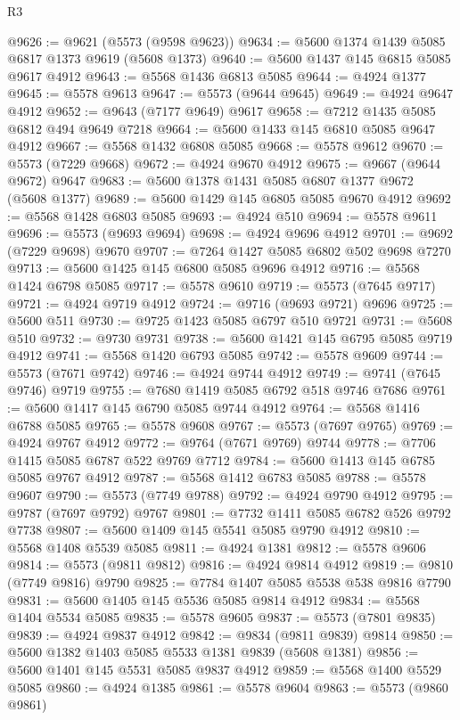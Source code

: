 \begin{lexlean}{R3}
\begin{coremodule}
@9626 := @9621 (@5573 (@9598 @9623))
@9634 := @5600 @1374 @1439 @5085 @6817 @1373 @9619 (@5608 @1373)
@9640 := @5600 @1437 @145 @6815 @5085 @9617 @4912
@9643 := @5568 @1436 @6813 @5085
@9644 := @4924 @1377
@9645 := @5578 @9613
@9647 := @5573 (@9644 @9645)
@9649 := @4924 @9647 @4912
@9652 := @9643 (@7177 @9649) @9617
@9658 := @7212 @1435 @5085 @6812 @494 @9649 @7218
@9664 := @5600 @1433 @145 @6810 @5085 @9647 @4912
@9667 := @5568 @1432 @6808 @5085
@9668 := @5578 @9612
@9670 := @5573 (@7229 @9668)
@9672 := @4924 @9670 @4912
@9675 := @9667 (@9644 @9672) @9647
@9683 := @5600 @1378 @1431 @5085 @6807 @1377 @9672 (@5608 @1377)
@9689 := @5600 @1429 @145 @6805 @5085 @9670 @4912
@9692 := @5568 @1428 @6803 @5085
@9693 := @4924 @510
@9694 := @5578 @9611
@9696 := @5573 (@9693 @9694)
@9698 := @4924 @9696 @4912
@9701 := @9692 (@7229 @9698) @9670
@9707 := @7264 @1427 @5085 @6802 @502 @9698 @7270
@9713 := @5600 @1425 @145 @6800 @5085 @9696 @4912
@9716 := @5568 @1424 @6798 @5085
@9717 := @5578 @9610
@9719 := @5573 (@7645 @9717)
@9721 := @4924 @9719 @4912
@9724 := @9716 (@9693 @9721) @9696
@9725 := @5600 @511
@9730 := @9725 @1423 @5085 @6797 @510 @9721
@9731 := @5608 @510
@9732 := @9730 @9731
@9738 := @5600 @1421 @145 @6795 @5085 @9719 @4912
@9741 := @5568 @1420 @6793 @5085
@9742 := @5578 @9609
@9744 := @5573 (@7671 @9742)
@9746 := @4924 @9744 @4912
@9749 := @9741 (@7645 @9746) @9719
@9755 := @7680 @1419 @5085 @6792 @518 @9746 @7686
@9761 := @5600 @1417 @145 @6790 @5085 @9744 @4912
@9764 := @5568 @1416 @6788 @5085
@9765 := @5578 @9608
@9767 := @5573 (@7697 @9765)
@9769 := @4924 @9767 @4912
@9772 := @9764 (@7671 @9769) @9744
@9778 := @7706 @1415 @5085 @6787 @522 @9769 @7712
@9784 := @5600 @1413 @145 @6785 @5085 @9767 @4912
@9787 := @5568 @1412 @6783 @5085
@9788 := @5578 @9607
@9790 := @5573 (@7749 @9788)
@9792 := @4924 @9790 @4912
@9795 := @9787 (@7697 @9792) @9767
@9801 := @7732 @1411 @5085 @6782 @526 @9792 @7738
@9807 := @5600 @1409 @145 @5541 @5085 @9790 @4912
@9810 := @5568 @1408 @5539 @5085
@9811 := @4924 @1381
@9812 := @5578 @9606
@9814 := @5573 (@9811 @9812)
@9816 := @4924 @9814 @4912
@9819 := @9810 (@7749 @9816) @9790
@9825 := @7784 @1407 @5085 @5538 @538 @9816 @7790
@9831 := @5600 @1405 @145 @5536 @5085 @9814 @4912
@9834 := @5568 @1404 @5534 @5085
@9835 := @5578 @9605
@9837 := @5573 (@7801 @9835)
@9839 := @4924 @9837 @4912
@9842 := @9834 (@9811 @9839) @9814
@9850 := @5600 @1382 @1403 @5085 @5533 @1381 @9839 (@5608 @1381)
@9856 := @5600 @1401 @145 @5531 @5085 @9837 @4912
@9859 := @5568 @1400 @5529 @5085
@9860 := @4924 @1385
@9861 := @5578 @9604
@9863 := @5573 (@9860 @9861)

\end{coremodule}
\end{lexlean}
